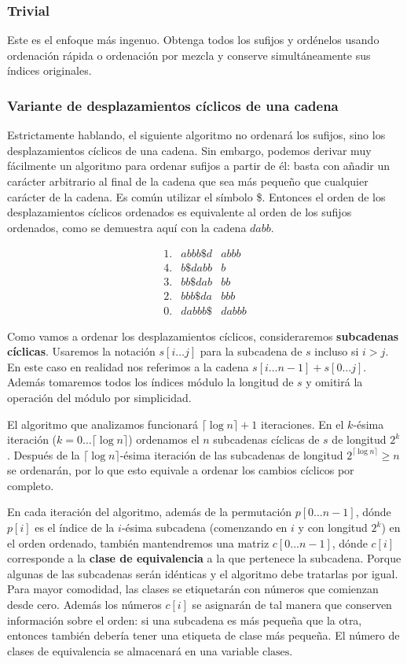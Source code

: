 \subsubsection{Trivial}
Este es el enfoque más ingenuo. Obtenga todos los sufijos y ordénelos usando ordenación rápida o ordenación por mezcla y conserve simultáneamente sus índices originales.

\subsubsection{Variante de desplazamientos cíclicos de una cadena}

Estrictamente hablando, el siguiente algoritmo no ordenará los sufijos, sino los 
desplazamientos cíclicos de una cadena. Sin embargo, podemos derivar muy 
fácilmente un algoritmo para ordenar sufijos a partir de él: basta con añadir un 
carácter arbitrario al final de la cadena que sea más pequeño que cualquier 
carácter de la cadena. Es común utilizar el símbolo \$. Entonces el orden de los 
desplazamientos cíclicos ordenados es equivalente al orden de los sufijos 
ordenados, como se demuestra aquí con la cadena $dabb$.

$$\begin{array}{lll} 1. & abbb\$d & abbb \\ 4. & b\$dabb & b \\ 3. & bb\$dab & bb \\ 2. & bbb\$da & bbb \\ 0. & dabbb\$ & dabbb \end{array}$$

Como vamos a ordenar los desplazamientos cíclicos, consideraremos \textbf{subcadenas cíclicas}. Usaremos la notación $s[i \dots j]$ para la subcadena de $s$
incluso si $i>j$. En este caso en realidad nos referimos a la cadena $s[i \dots n-1]+s[0 \dots j]$. Además tomaremos todos los índices módulo la 
longitud de $s$ y omitirá la operación del módulo por simplicidad.

El algoritmo que analizamos funcionará $\lceil \log n \rceil + 1$ iteraciones. En el $k$-ésima iteración ($k = 0 \dots \lceil \log n \rceil$) ordenamos el
$n$ subcadenas cíclicas de $s$ de longitud $2^k$. Después de la $\lceil \log n \rceil$-ésima iteración de las subcadenas de longitud
$2^{\lceil \log n \rceil} \ge n$ se ordenarán, por lo que esto equivale a ordenar los cambios cíclicos por completo.

En cada iteración del algoritmo, además de la permutación $p[0 \dots n-1]$, dónde $p[i]$ es el índice de la $i$-ésima subcadena (comenzando en $i$ y con
longitud $2^k$) en el orden ordenado, también mantendremos una matriz $c[0 \dots n-1]$, dónde $c[i]$ corresponde a la \textbf{clase de equivalencia} a la que 
pertenece la subcadena. Porque algunas de las subcadenas serán idénticas y el algoritmo debe tratarlas por igual. Para mayor comodidad, las clases se
etiquetarán con números que comienzan desde cero. Además los números $c[i]$ se asignarán de tal manera que conserven información sobre el orden: si una subcadena es más pequeña que la otra, entonces también debería tener una etiqueta de clase más pequeña. El número de clases de equivalencia se almacenará en 
una variable $\text{clases}$.

